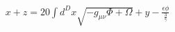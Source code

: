 \documentclass[preview]{standalone}
\begin{document}
\begin{align*}
x+ z= 20\int{d^{D}x}\sqrt{-g_{\mu\nu} \Phi + \Omega}+ y - \frac{\epsilon\phi}{\frac{3}{\gamma}}
\end{align*}
\end{document}
